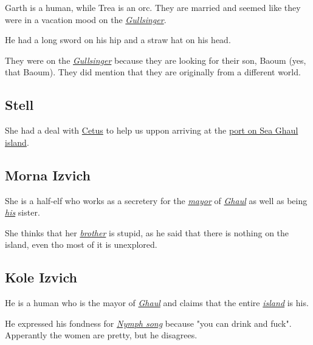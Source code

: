 \documentclass{article}
\begin{document}
\begin{multicols}{2}
    Garth is a human, while Trea is an orc. They are married and seemed like they were in a vacation mood on the \hyperref[gullsinger]{\textit{Gullsinger}}.

    He had a long sword on his hip and a straw hat on his head.

    They were on the \hyperref[gullsinger]{\textit{Gullsinger}} because they are looking for their son, Baoum (yes, that Baoum). They did mention that they are originally from a different world.

    \subsection{Stell}
    \label{stell}

    She had a deal with \hyperref[cetus]{Cetus} to help us uppon arriving at the \hyperref[port_sea_ghaul]{port on Sea Ghaul island}.

    \subsection{Morna Izvich}
    \label{morna}

    She is a half-elf who works as a secretery for the \hyperref[kole]{\textit{mayor}} of \hyperref[ghaul]{\textit{Ghaul}} as well as being \hyperref[kole]{\textit{his}} sister.

    She thinks that her \hyperref[kole]{\textit{brother}} is stupid, as he said that there is nothing on the island, even tho most of it is unexplored.

    \subsection{Kole Izvich}
    \label{Kole}

    He is a human who is the mayor of \hyperref[ghaul]{\textit{Ghaul}} and claims that the entire \hyperref[sea_ghaul_island]{\textit{island}} is his.

    He expressed his fondness for \hyperref[nymph]{\textit{Nymph song}} because "you can drink and fuck". Apperantly the women are pretty, but he disagrees.


\end{multicols}
\end{document}

